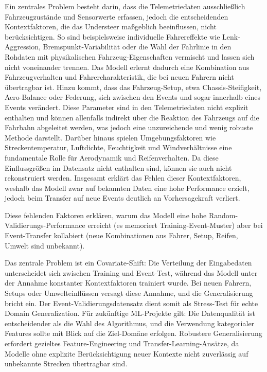 Ein zentrales Problem besteht darin, dass die Telemetriedaten ausschließlich Fahrzeugzustände und Sensorwerte erfassen, jedoch die entscheidenden Kontextfaktoren, die das Understeer maßgeblich beeinflussen, nicht berücksichtigen. So sind beispielsweise individuelle Fahrereffekte wie Lenk-Aggression, Bremspunkt-Variabilität oder die Wahl der Fahrlinie in den Rohdaten mit physikalischen Fahrzeug-Eigenschaften vermischt und lassen sich nicht voneinander trennen. Das Modell erlernt dadurch eine Kombination aus Fahrzeugverhalten und Fahrercharakteristik, die bei neuen Fahrern nicht übertragbar ist. Hinzu kommt, dass das Fahrzeug-Setup, etwa Chassis-Steifigkeit, Aero-Balance oder Federung, sich zwischen den Events und sogar innerhalb eines Events verändert. Diese Parameter sind in den Telemetriedaten nicht explizit enthalten und können allenfalls indirekt über die Reaktion des Fahrzeugs auf die Fahrbahn abgeleitet werden, was jedoch eine unzureichende und wenig robuste Methode darstellt. Darüber hinaus spielen Umgebungsfaktoren wie Streckentemperatur, Luftdichte, Feuchtigkeit und Windverhältnisse eine fundamentale Rolle für Aerodynamik und Reifenverhalten. Da diese Einflussgrößen im Datensatz nicht enthalten sind, können sie auch nicht rekonstruiert werden. Insgesamt erklärt das Fehlen dieser Kontextfaktoren, weshalb das Modell zwar auf bekannten Daten eine hohe Performance erzielt, jedoch beim Transfer auf neue Events deutlich an Vorhersagekraft verliert.

Diese fehlenden Faktoren erklären, warum das Modell eine hohe Random-Validierungs-Performance erreicht (es memoriert Training-Event-Muster) aber bei Event-Transfer kollabiert (neue Kombinationen aus Fahrer, Setup, Reifen, Umwelt sind unbekannt).

Das zentrale Problem ist ein Covariate-Shift: Die Verteilung der Eingabedaten unterscheidet sich zwischen Training und Event-Test, während das Modell unter der Annahme konstanter Kontextfaktoren trainiert wurde. Bei neuen Fahrern, Setups oder Umwelteinflüssen versagt diese Annahme, und die Generalisierung bricht ein. Der Event-Validierungsdatensatz dient somit als Stress-Test für echte Domain Generalization. Für zukünftige ML-Projekte gilt: Die Datenqualität ist entscheidender als die Wahl des Algorithmus, und die Verwendung kategorialer Features sollte mit Blick auf die Ziel-Domäne erfolgen. Robustere Generalisierung erfordert gezieltes Feature-Engineering und Transfer-Learning-Ansätze, da Modelle ohne explizite Berücksichtigung neuer Kontexte nicht zuverlässig auf unbekannte Strecken übertragbar sind.
